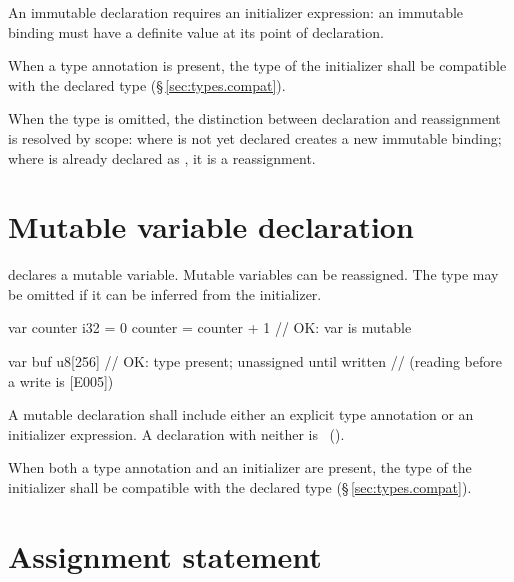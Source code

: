 \begin{constraint}
  An immutable declaration requires an initializer expression: an immutable
  binding must have a definite value at its point of declaration.
\end{constraint}

\begin{constraint}
  When a type annotation is present, the type of the initializer shall be
  compatible with the declared type (\S\,\ref{sec:types.compat}).
\end{constraint}

\begin{note}
  When the type is omitted, the distinction between declaration and
  reassignment is resolved by scope:  where  is not
  yet declared creates a new immutable binding; where  is already
  declared as , it is a reassignment.
\end{note}

\section{Mutable variable declaration}
\label{sec:stmt.var}

\pnum
{} declares a mutable variable.  Mutable variables
can be reassigned.  The type may be omitted if it can be inferred from the
initializer.

\begin{laincode}
var counter i32 = 0
counter = counter + 1       // OK: var is mutable

var buf u8[256]              // OK: type present; unassigned until written
                            // (reading before a write is [E005])
\end{laincode}

\begin{constraint}
  A mutable declaration shall include either an explicit type annotation
  or an initializer expression.  A declaration with neither is
  \illformed{}~().
\end{constraint}

\begin{constraint}
  When both a type annotation and an initializer are present, the type of
  the initializer shall be compatible with the declared type
  (\S\,\ref{sec:types.compat}).
\end{constraint}

\section{Assignment statement}
\label{sec:stmt.assign}

